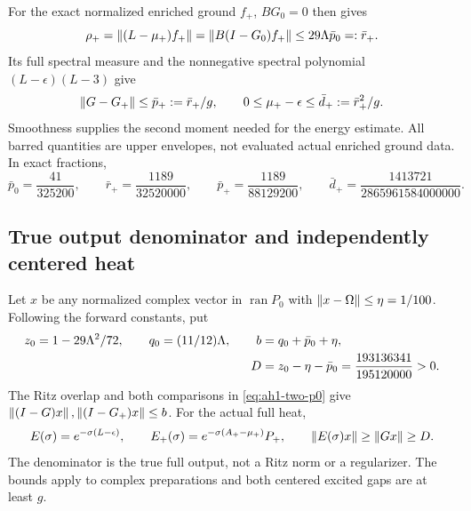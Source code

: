 For the exact normalized enriched ground $f_+$, $BG_0=0$ then gives
\begin{equation}
 \rho_+=\left\lVert(L-\mu_+)f_+\right\rVert=\left\lVert B(I-G_0)f_+\right\rVert
 \le29\Lambda\bar p_0=:\bar r_+.
\end{equation}
Its full spectral measure and the nonnegative spectral polynomial $(L-\epsilon)(L-3)$ give
\begin{equation}
 \left\lVert G-G_+\right\rVert\le\bar p_+:=\bar r_+/g,
 \qquad0\le\mu_+-\epsilon\le\bar d_+:=\bar r_+^2/g.
 \label{eq:ah1-plus-residual}
\end{equation}
Smoothness supplies the second moment needed for the energy estimate. All barred quantities are upper envelopes, not evaluated actual enriched ground data. In exact fractions,
\begin{equation}
 \bar p_0=\frac{41}{325200},\qquad
 \bar r_+=\frac{1189}{32520000},\qquad
 \bar p_+=\frac{1189}{88129200},\qquad
 \bar d_+=\frac{1413721}{2865961584000000}.
\end{equation}

\subsection{True output denominator and independently centered heat}
Let $x$ be any normalized complex vector in $\operatorname{ran}P_0$ with $\left\lVert x-\Omega\right\rVert\le\eta=1/100$. Following the forward constants, put
\begin{align}
 z_0=1-29\Lambda^2/72,\qquad q_0=(11/12)\Lambda,\qquad
 b&=q_0+\bar p_0+\eta,\notag\\
 D&=z_0-\eta-\bar p_0=\frac{193136341}{195120000}>0.
 \label{eq:ah1-true-floor}
\end{align}
The Ritz overlap and both comparisons in \eqref{eq:ah1-two-p0} give
$\left\lVert(I-G)x\right\rVert,\left\lVert(I-G_+)x\right\rVert\le b$. For the actual full heat,
\begin{equation}
 E(\sigma)=e^{-\sigma(L-\epsilon)},\qquad
 E_+(\sigma)=e^{-\sigma(A_+-\mu_+)}P_+,
 \qquad\left\lVert E(\sigma)x\right\rVert\ge\left\lVert Gx\right\rVert\ge D.
 \label{eq:ah1-heats}
\end{equation}
The denominator is the true full output, not a Ritz norm or a regularizer. The bounds apply to complex preparations and both centered excited gaps are at least $g$.

